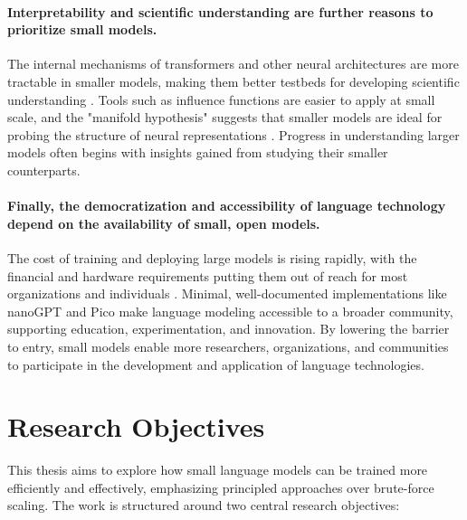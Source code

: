 \paragraph{Interpretability and scientific understanding are further reasons to prioritize small models.} The internal mechanisms of transformers and other neural architectures are more tractable in smaller models, making them better testbeds for developing scientific understanding \citep{elhage2021mathematical, elhage2022toy, bircken2023monosemanticity, anthropic2023components}. Tools such as influence functions are easier to apply at small scale, and the "manifold hypothesis" suggests that smaller models are ideal for probing the structure of neural representations \citep{olah2014manifolds}. Progress in understanding larger models often begins with insights gained from studying their smaller counterparts.

\paragraph{Finally, the democratization and accessibility of language technology depend on the availability of small, open models.} The cost of training and deploying large models is rising rapidly, with the financial and hardware requirements putting them out of reach for most organizations and individuals \citep{cottier2024rising, sharir2020cost}. Minimal, well-documented implementations like nanoGPT \citep{karpathy2023nanogpt} and Pico \citep{diehlmartinez2025pico} make language modeling accessible to a broader community, supporting education, experimentation, and innovation. By lowering the barrier to entry, small models enable more researchers, organizations, and communities to participate in the development and application of language technologies.


\section*{Research Objectives}

This thesis aims to explore how small language models can be trained more efficiently and effectively, emphasizing principled approaches over brute-force scaling. The work is structured around two central research objectives:


